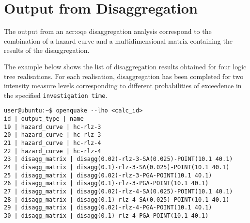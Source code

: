 \section{Output from Disaggregation}
The output from an \gls{acr:oqe} disaggregation analysis  
correspond to the combination of a hazard curve and a multidimensional 
matrix containing the results of the disaggregation.

The example below shows the list of disaggregation results obtained 
for four logic tree realisations. 
For each realisation, disaggregation has been completed for two  
intensity measure levels corresponding to different probabilities of 
exceedence in the specified \texttt{investigation time}.
\begin{Verbatim}[frame=single, commandchars=\\\{\}, samepage=true]
user@ubuntu:~$ openquake --lho <calc_id> 
id | output_type | name
19 | hazard_curve | hc-rlz-3
20 | hazard_curve | hc-rlz-3
21 | hazard_curve | hc-rlz-4
22 | hazard_curve | hc-rlz-4
23 | disagg_matrix | disagg(0.02)-rlz-3-SA(0.025)-POINT(10.1 40.1)
24 | disagg_matrix | disagg(0.1)-rlz-3-SA(0.025)-POINT(10.1 40.1)
25 | disagg_matrix | disagg(0.02)-rlz-3-PGA-POINT(10.1 40.1)
26 | disagg_matrix | disagg(0.1)-rlz-3-PGA-POINT(10.1 40.1)
27 | disagg_matrix | disagg(0.02)-rlz-4-SA(0.025)-POINT(10.1 40.1)
28 | disagg_matrix | disagg(0.1)-rlz-4-SA(0.025)-POINT(10.1 40.1)
29 | disagg_matrix | disagg(0.02)-rlz-4-PGA-POINT(10.1 40.1)
30 | disagg_matrix | disagg(0.1)-rlz-4-PGA-POINT(10.1 40.1)
\end{Verbatim}

